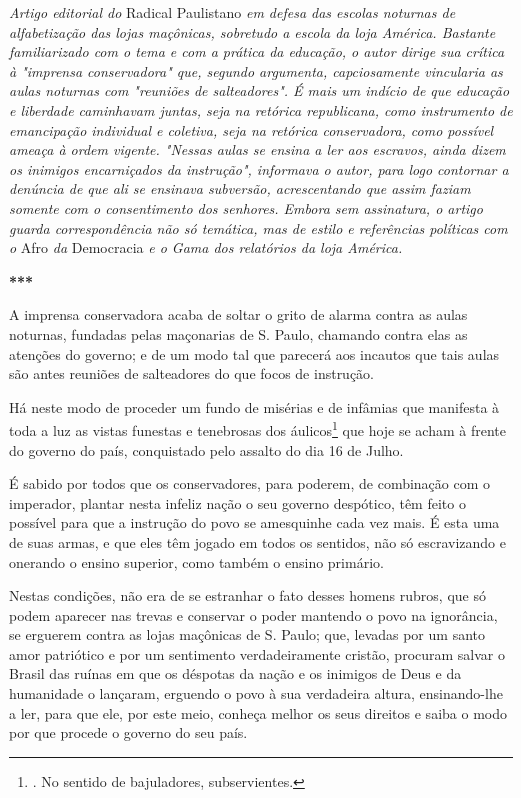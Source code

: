 \emph{Artigo editorial do} Radical Paulistano \emph{em defesa das
escolas noturnas de alfabetização das lojas maçônicas, sobretudo a
escola da loja América. Bastante familiarizado com o tema e com a
prática da educação, o autor dirige sua crítica à "imprensa
conservadora" que, segundo argumenta, capciosamente vincularia as aulas
noturnas com "reuniões de salteadores". É mais um indício de que
educação e liberdade caminhavam juntas, seja na retórica republicana,
como instrumento de emancipação individual e coletiva, seja na retórica
conservadora, como possível ameaça à ordem vigente. "Nessas aulas se
ensina a ler aos escravos, ainda dizem os inimigos encarniçados da
instrução", informava o autor, para logo contornar a denúncia de que ali
se ensinava subversão, acrescentando que assim faziam somente com o
consentimento dos senhores. Embora sem assinatura, o artigo guarda
correspondência não só temática, mas de estilo e referências políticas
com o} Afro \emph{da} Democracia \emph{e o Gama dos relatórios da loja
América.}

\textbf{***}

A imprensa conservadora acaba de soltar o grito de alarma contra as
aulas noturnas, fundadas pelas maçonarias de S. Paulo, chamando contra
elas as atenções do governo; e de um modo tal que parecerá aos incautos
que tais aulas são antes reuniões de salteadores do que focos de
instrução.

Há neste modo de proceder um fundo de misérias e de infâmias que
manifesta à toda a luz as vistas funestas e tenebrosas dos
áulicos\footnote{. No sentido de bajuladores, subservientes.} que hoje
se acham à frente do governo do país, conquistado pelo assalto do dia 16
de Julho.

É sabido por todos que os conservadores, para poderem, de combinação com
o imperador, plantar nesta infeliz nação o seu governo despótico, têm
feito o possível para que a instrução do povo se amesquinhe cada vez
mais. É esta uma de suas armas, e que eles têm jogado em todos os
sentidos, não só escravizando e onerando o ensino superior, como também
o ensino primário.

Nestas condições, não era de se estranhar o fato desses homens rubros,
que só podem aparecer nas trevas e conservar o poder mantendo o povo na
ignorância, se erguerem contra as lojas maçônicas de S. Paulo; que,
levadas por um santo amor patriótico e por um sentimento verdadeiramente
cristão, procuram salvar o Brasil das ruínas em que os déspotas da nação
e os inimigos de Deus e da humanidade o lançaram, erguendo o povo à sua
verdadeira altura, ensinando-lhe a ler, para que ele, por este meio,
conheça melhor os seus direitos e saiba o modo por que procede o governo
do seu país.

